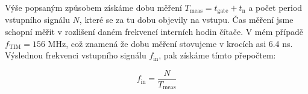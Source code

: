  Výše popsaným způsobem získáme dobu měření $T_{\text{meas}}=t_{\text{gate}}+ t_{\text{n}}$ a počet period vstupního signálu $N$, které se za tu dobu objevily na vstupu. Čas měření jsme schopní měřit v rozlišení daném frekvencí interních hodin čítače. V mém případě $f_{\text{TIM}}=156 \text{ MHz} $, což znamená že dobu měření stovujeme v krocích asi 6.4 ns. Výslednou frekvenci vstupního signálu $f_{\text{in}}$, pak získáme tímto přepočtem:
 
 \begin{equation}
 	f_{\text{in}}=\frac{N}{T_{\text{meas}}}
 \end{equation}
 
